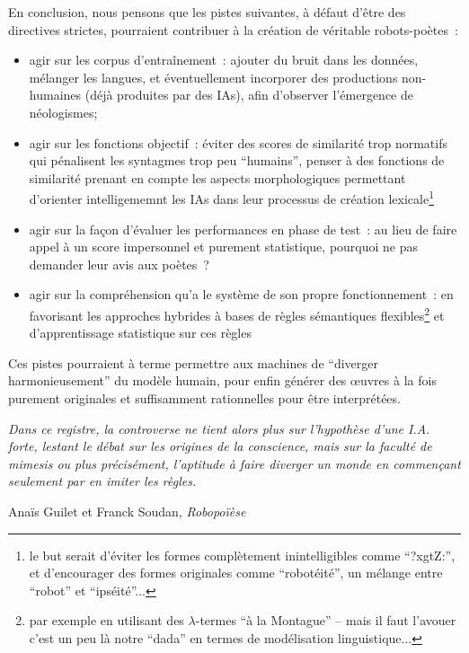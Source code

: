 \documentclass{article}
\newenvironment{citationbox}
{\begin{center}
		\begin{minipage}{.8\textwidth}
		}
		{
		\end{minipage}	
\end{center}
}
\begin{document}
				En conclusion, nous pensons que les pistes suivantes, à défaut d'être des directives strictes, pourraient contribuer à la création de véritable robots-poètes~:
				\vspace{2mm}
				\begin{itemize}
					\item agir sur les corpus d'entraînement~: ajouter du bruit dans les données, mélanger les langues, et éventuellement incorporer des productions non-humaines (déjà produites par des IAs), afin d'observer l'émergence de néologismes;
					\item agir sur les fonctions objectif~: éviter des scores de similarité trop normatifs qui pénalisent les syntagmes trop peu ``humains'', penser à des fonctions de similarité prenant en compte les aspects morphologiques permettant d'orienter intelligememnt les IAs dans leur processus de création lexicale\footnote{le but serait d'éviter les formes complètement inintelligibles comme ``?xgtZ:'', et d'encourager des formes originales comme ``robotéité'', un mélange entre ``robot'' et ``ipséité''...}
					\item agir sur la façon d'évaluer les performances en phase de test~: au lieu de faire appel à un score impersonnel et purement statistique, pourquoi ne pas demander leur avis aux poètes~? 
					\item agir sur la compréhension qu'a le système de son propre fonctionnement~: en favorisant les approches hybrides à bases de règles sémantiques flexibles\footnote{par exemple en utilisant des $\lambda$-termes ``à la Montague'' -- mais il faut l'avouer c'est un peu là notre ``dada'' en termes de modélisation linguistique...} et d'apprentissage statistique sur ces règles
				\end{itemize}
				\vspace{2mm}
				Ces pistes pourraient à terme permettre aux machines de ``diverger harmonieusement'' du modèle humain, pour enfin générer des œuvres à la fois purement originales et suffisamment rationnelles pour être interprétées.
				\begin{citationbox}
					\textit{Dans ce registre, la controverse ne tient alors plus sur l'hypothèse d'une I.A. forte, lestant le débat sur les origines de la conscience, mais sur la faculté de mimesis ou plus précisément, l'aptitude à faire diverger un monde en commençant seulement par en imiter les règles.}
					\begin{flushright}
						Anaïs Guilet et Franck Soudan, \textit{Robopoïèse} \cite{guilet2017}
					\end{flushright}
				\end{citationbox}
	
\end{document}

